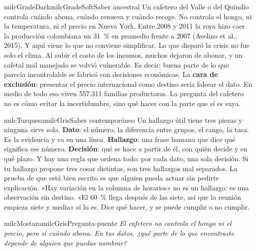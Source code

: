 \documentclass[11pt,letterpaper]{article}
\begin{document}
\begin{softbox}{milcGradeDark}{milcGradeSoft}{Saber ancestral}
Un cafetero del Valle o del Quindío controla cuándo abona, cuándo renueva y cuándo recoge. No controla el hongo, ni la temperatura, ni el precio en Nueva York. Entre 2008 y 2011 la roya hizo caer la producción colombiana un 31~\% en promedio frente a 2007 (Avelino et al., 2015). Y aquí viene lo que no conviene simplificar. Lo que disparó la crisis no fue solo el clima. Al subir el costo de los insumos, muchos dejaron de abonar, y un cafetal mal manejado se volvió vulnerable. Es decir: buena parte de lo que parecía incontrolable se fabricó con decisiones económicas. La \textbf{cara de exclusión}: presentar el precio internacional como destino sería falsear el dato. En medio de todo eso viven 557.311 familias productoras. La pregunta del cafetero no es cómo evitar la incertidumbre, sino qué hacer con la parte que sí es suya.\par{}
\end{softbox}

\begin{softbox}{milcTurquesa}{milcGris}{Saber contemporáneo}
Un hallazgo útil tiene tres piezas y ninguna sirve sola. \textbf{Dato}: el número, la diferencia entre grupos, el rango, la tasa. Es la evidencia y va en una línea. \textbf{Hallazgo}: una frase humana que dice qué significa ese número. \textbf{Decisión}: qué se hace a partir de él, con quién decide y en qué plazo. Y hay una regla que ordena todo: por cada dato, una sola decisión. Si tu hallazgo propone tres cosas distintas, son tres hallazgos mal separados. La prueba de que está bien escrito es que alguien pueda actuar sin pedirte explicación. «Hay variación en la columna de horarios» no es un hallazgo: es una observación sin destino. «El 60~\% llega después de las siete, así que la reunión empieza siete y media» sí lo es. Dice qué hacer, y se puede cumplir o no cumplir.
\end{softbox}

\begin{softbox}{milcMostaza}{milcGris}{Pregunta-puente}
\textit{El cafetero no controla el hongo ni el precio, pero sí cuándo abona. En tus datos, ¿qué parte de lo que encontraste depende de alguien que puedas nombrar?}
\end{softbox}
\end{document}
